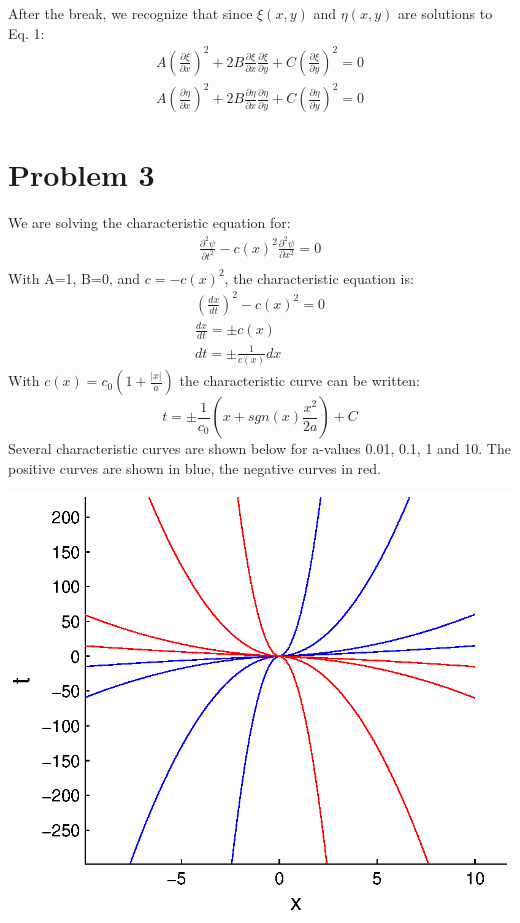 \documentclass[a4paper,10pt]{article}
\numberwithin{equation}{section}
\begin{document}
After the break, we recognize that since $\xi(x,y)$ and $\eta(x,y)$ are solutions to Eq. 1:
\begin{gather}
 A(\frac{\partial \xi}{\partial x})^2+2B\frac{\partial \xi}{\partial x}\frac{\partial \xi}{ \partial y}+C(\frac{\partial \xi}{\partial y})^2=0\\
 A(\frac{\partial \eta}{\partial x})^2+2B\frac{\partial \eta}{\partial x}\frac{\partial \eta}{ \partial y}+C(\frac{\partial \eta}{\partial y})^2=0
\end{gather}

\section{Problem 3}
We are solving the characteristic equation for:
\begin{gather*}
 \frac{\partial ^2\psi}{\partial t^2}-c(x)^2\frac{\partial ^2 \psi}{\partial x^2}=0\\
\end{gather*}
With A=1, B=0, and $c=-c(x)^2$, the characteristic equation is:
\begin{gather}
(\frac{dx}{dt})^2-c(x)^2=0\\
\frac{dx}{dt}=\pm c(x)\\
dt=\pm\frac{1}{c(x)}dx
\end{gather}
With $c(x)=c_0(1+\frac{|x|}{a})$ the characteristic curve can be written:
\begin{equation}
t=\pm\frac{1}{c_0}(x+sgn(x)\frac{x^2}{2a})+C
\end{equation}
Several characteristic curves are shown below for a-values 0.01, 0.1, 1 and 10. The positive curves are shown in blue, the negative curves in red.

\includegraphics{p3chars}
\end{document}
